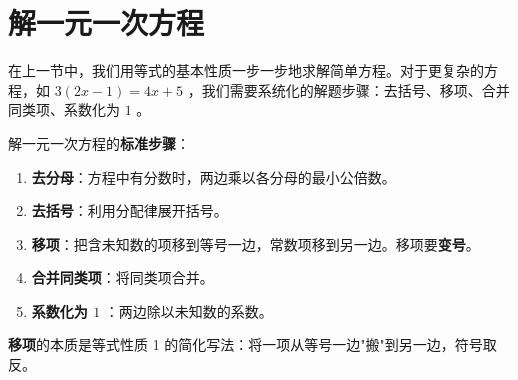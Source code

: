 \section*{解一元一次方程}


\begin{explore}


在上一节中，我们用等式的基本性质一步一步地求解简单方程。对于更复杂的方程，如 $3(2x - 1) = 4x + 5$ ，我们需要系统化的解题步骤：去括号、移项、合并同类项、系数化为 $1$ 。

\end{explore}

\begin{understand}


解一元一次方程的\textbf{标准步骤}：

\begin{enumerate}
  \item \textbf{去分母}：方程中有分数时，两边乘以各分母的最小公倍数。
  \item \textbf{去括号}：利用分配律展开括号。
  \item \textbf{移项}：把含未知数的项移到等号一边，常数项移到另一边。移项要\textbf{变号}。
  \item \textbf{合并同类项}：将同类项合并。
  \item \textbf{系数化为 $1$ }：两边除以未知数的系数。
\end{enumerate}


\textbf{移项}的本质是等式性质 1 的简化写法：将一项从等号一边"搬"到另一边，符号取反。

\end{understand}

